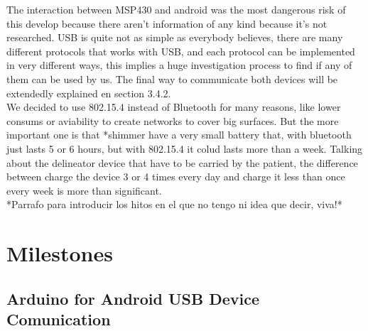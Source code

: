 	The interaction between MSP430 and android was the most dangerous risk of this develop because there aren't information of any kind because it's not researched. USB is quite not as simple as everybody believes, there are many different protocols that works with USB, and each protocol can be implemented in very different ways, this implies a huge investigation process to find if any of them can be used by us. The final way to communicate both devices will be extendedly explained en section 3.4.2.\\

	We decided to use 802.15.4 instead of Bluetooth for many reasons, like lower consums or aviability to create networks to cover big surfaces. But the more important one is that *shimmer have a very small battery that, with bluetooth just lasts 5 or 6 hours, but with 802.15.4 it colud lasts more than a week. Talking about the delineator device that have to be carried by the patient, the difference between charge the device 3 or 4 times every day and charge it less than once every week is more than significant.\\

	*Parrafo para introducir los hitos en el que no tengo ni idea que decir, viva!*	
	
	\section{Milestones}	

		\subsection{Arduino for Android USB Device Comunication}

